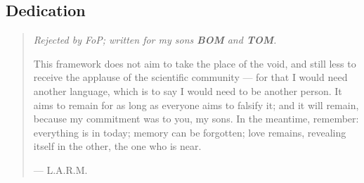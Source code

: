 \documentclass[11pt]{article}
\theoremstyle{definition}\newtheorem{deriv}{Derivation}
\begin{document}
\subsection*{Dedication}\begin{quote}\itshape Rejected by FoP; written for my sons \textbf{BOM} and \textbf{TOM}.\par\medskip This framework does not aim to take the place of the void, and still less to receive the applause of the scientific community --- for that I would need another language, which is to say I would need to be another person. It aims to remain for as long as everyone aims to falsify it; and it will remain, because my commitment was to you, my sons. In the meantime, remember: everything is in today; memory can be forgotten; love remains, revealing itself in the other, the one who is near.\par\medskip\upshape\hfill --- L.A.R.M.\end{quote}
\end{document}
